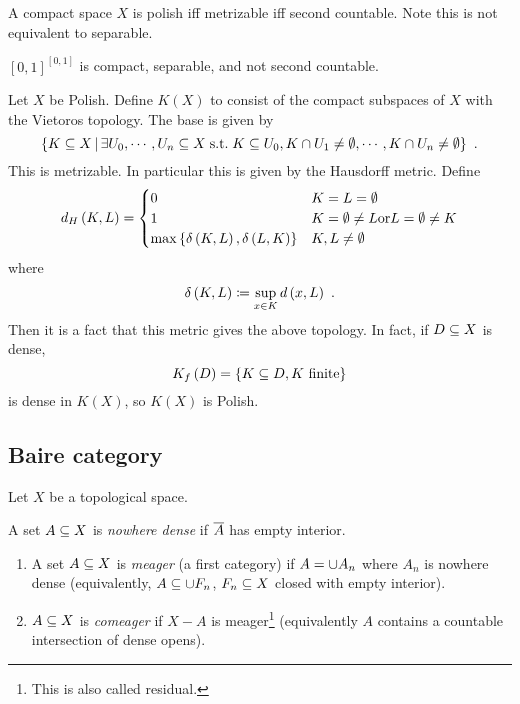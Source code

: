 \documentclass{amsart}
\begin{document}
A compact space $X$ is polish iff metrizable iff second countable.
Note this is not equivalent to separable. 

\begin{exm}
$\left[ 0,1 \right]^{\left[ 0,1 \right]}$ is compact, separable, and not second countable.
\end{exm}

Let $X$ be Polish. Define $K\left( X \right)$ to consist of the compact subspaces of $X$
with the Vietoros topology. The base is given by
\begin{equation}
\left\{ K\subeq X \st \exists U_0 , \cdots , U_n\subeq X\suchthat
K\subeq U_0, K\cap U_1\neq \emp, \cdots , K\cap U_n \neq \emp \right\} \ .
\end{equation}
This is metrizable. In particular this is given by the Hausdorff metric. 
Define 
\begin{equation}
d_H\left( K , L \right) = 
\begin{cases}
0 & K = L = \emptyset\\
1 & K =  \emptyset \neq L \text{or} L = \emptyset \neq K\\
\max\left\{ \delta\left( K , L \right) , \delta\left( L , K \right) \right\} & K,L\neq \emptyset
\end{cases}
\end{equation}
where
\begin{equation}
\delta\left( K , L \right)\coloneqq \sup_{x\in K} d\left( x,L \right) \ .
\end{equation}
Then it is a fact that this metric gives the above topology. 
In fact, if $D\subseteq X$ is dense, 
\begin{equation}
K_f\left( D \right) = \left\{ K\subseteq D,K\text{ finite} \right\}
\end{equation}
is dense in $K\left( X \right)$, so $K\left( X \right)$ is Polish.

\subsection{Baire category}

Let $X$ be a topological space.

\begin{defn}
A set $A\subseteq X$ is \emph{nowhere dense} if $\overline{A}$ has empty interior. 
\begin{enumerate}
\item A set $A\subseteq X$ is \emph{meager} (a first category)
if $A = \cup A_n$ where $A_n$ is nowhere dense
(equivalently, $A\subseteq \cup F_n$, $F_n\subseteq X$ closed with empty interior).
\item $A\subseteq X$ is \emph{comeager} if $X\minus  A$ is meager\footnote{This is also
called residual.}
(equivalently $A$ contains a countable intersection of dense opens).
\end{enumerate}
\end{defn}
\end{document}
